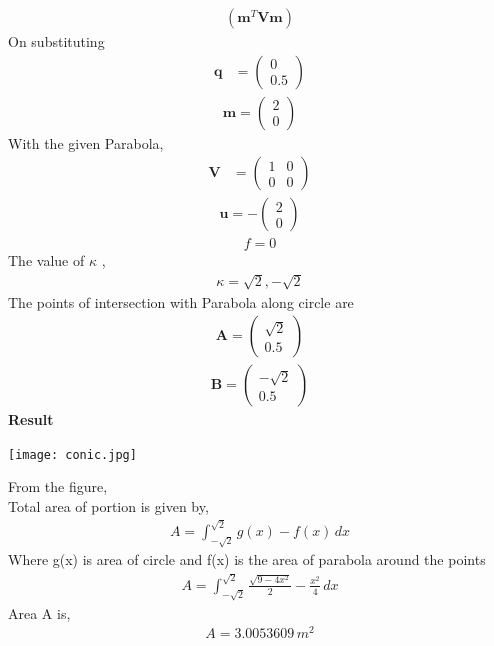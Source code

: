 \documentclass[10pt,a4paper]{report}
\newcommand{\myvec}[1]{\ensuremath{\begin{pmatrix}#1\end{pmatrix}}}
\let\vec\mathbf
\let\vec\mathbf
\providecommand{\brak}[1]{\ensuremath{\left(#1\right)}}
\begin{document}
\begin{multicols}{2}
{\begin{multline}
{{{}
\brak{\vec{m}^T\vec{V}\vec{m}}
}
}
\end{multline}
}
\fi
On substituting
\begin{align}
\vec{q} &= \myvec{
0\\
0.5
} 
\end{align}
\begin{align}
\vec{m} = \myvec{2 \\ 0}
\end{align}
With the given Parabola,\\ 
\begin{align}
	\vec{V} &= \myvec{
1 & 0\\
0 & 0
    }
\end{align}
\begin{align}
	\vec{u} = -\myvec{2 \\0}
 \end{align}
 \begin{align}
  f = 0
 \end{align}
The value of $\kappa$ ,\\
\begin{align}
    \kappa = \sqrt{2},-\sqrt{2}
\end{align}
The points of intersection with Parabola along circle are \\
\begin{align}
    \vec{A}=\myvec{
\sqrt{2}\\
0.5
    }
\end{align}
\begin{align}
    \vec{B}=\myvec{
-\sqrt{2}\\
0.5
    }
\end{align}
\textbf{Result}
\begin{center}
 \texttt{[image: conic.jpg]}  
 \end{center}
 From the figure,\\ 
Total area of portion is given by, \\ 
\begin{align}
 A=  \int_{-\sqrt{2}}^{\sqrt{2}} g(x)-f(x) \,dx 
\end{align}
Where g(x) is area of circle and f(x) is the area of parabola around the points\\ 
\begin{align}
A= \int_{-\sqrt{2}}^{\sqrt{2}} \frac{\sqrt{9-4x^2}}{2}-\frac{x^2}{4} \,dx 
\end{align}
Area A is,\\ 
\begin{align}
    A= 3.0053609 \,m^2
\end{align}

\end{multicols}
\end{document}
